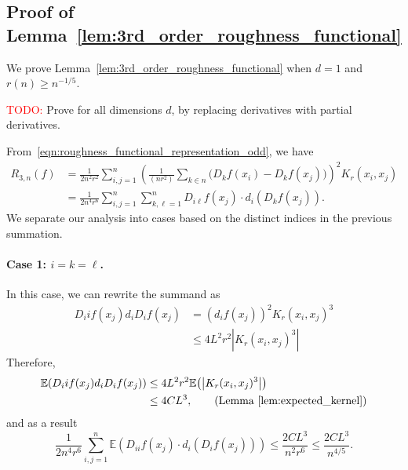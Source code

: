 \documentclass{article}
\newcommand{\abs}[1]{\left \lvert #1 \right \rvert}
\newcommand{\1}{\mathbf{1}}
\newcommand{\Ebb}{\mathbb{E}}
\theoremstyle{alden}
\theoremstyle{aldenthm}
\theoremstyle{definition}
\theoremstyle{remark}
\begin{document}
\subsection{Proof of Lemma~\ref{lem:3rd_order_roughness_functional}}
We prove Lemma~\ref{lem:3rd_order_roughness_functional} when $d = 1$ and $r(n) \geq n^{-1/5}$.

\textcolor{red}{TODO:} Prove for all dimensions $d$, by replacing derivatives with partial derivatives.

From~\eqref{eqn:roughness_functional_representation_odd}, we have
\begin{align*}
R_{3,n}(f) & = \frac{1}{2n^2r^2}\sum_{i,j = 1}^{n}\left(\frac{1}{(nr^2)}\sum_{k \in n}\bigl(D_kf(x_i) - D_kf(x_j)\bigr)\right)^2K_r(x_i,x_j) \\
& = \frac{1}{2n^4r^6}\sum_{i,j = 1}^{n} \sum_{k,\ell = 1}^{n} D_{i\ell}f(x_j) \cdot d_i(D_kf(x_j)).
\end{align*}
We separate our analysis into cases based on the distinct indices in the previous summation.

\paragraph{Case 1: $i = k = \ell$.}
In this case, we can rewrite the summand as
\begin{align*}
D_iif(x_j) d_iD_if(x_j) & = (d_if(x_j))^2 K_r(x_i,x_j)^3 \\
& \leq 4L^2r^2 \abs{K_r(x_i,x_j)^3}
\end{align*}
Therefore,
\begin{align*}
\Ebb(D_iif(x_j) d_iD_if(x_j)) & \leq 4L^2 r^2 \Ebb\bigl(\abs{K_r(x_i,x_j)^3}\bigr)\\
& \leq 4CL^3, \tag{Lemma~\ref{lem:expected_kernel}}
\end{align*}
and as a result
\begin{equation*}
\frac{1}{2n^4r^6}\sum_{i,j = 1}^{n} \Ebb(D_{ii}f(x_j) \cdot d_i(D_if(x_j))) \leq \frac{2CL^3}{n^2r^6} \leq \frac{2CL^3}{n^{4/5}}.
\end{equation*}
\end{document}
